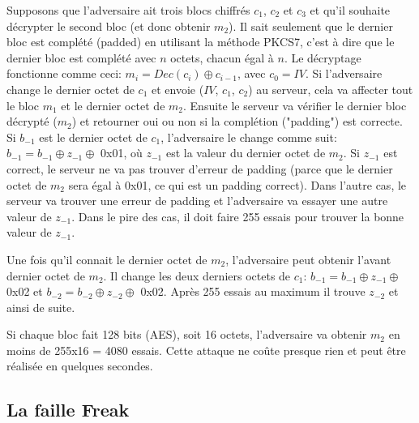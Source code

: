 Supposons que l'adversaire ait trois blocs chiffrés $c_1$, $c_2$ et $c_3$ et qu'il souhaite décrypter le second bloc (et donc obtenir $m_2$). Il sait seulement que le dernier bloc est complété (padded) en utilisant la méthode PKCS7, c'est à dire que le dernier bloc est complété avec $n$ octets, chacun égal à $n$.
Le décryptage fonctionne comme ceci: $m_i = Dec(c_i) \oplus c_{i-1}$, avec $c_0 = IV$. Si l'adversaire change le dernier octet de $c_1$ et envoie ($IV$, $c_1$, $c_2$) au serveur, cela va affecter tout le bloc $m_1$ et le dernier octet de $m_2$. Ensuite le serveur va vérifier le dernier bloc décrypté ($m_2$) et retourner oui ou non si la complétion ("padding") est correcte.
Si $b_{-1}$ est le dernier octet de $c_1$, l'adversaire le change comme suit: $b_{-1} = b_{-1} \oplus z_{-1} \oplus$ 0x01, où $z_{-1}$ est la valeur du dernier octet de $m_2$. Si $z_{-1}$ est correct, le serveur ne va pas trouver d'erreur de padding (parce que le dernier octet de $m_2$ sera égal à 0x01, ce qui est un padding correct). Dans l'autre cas, le serveur va trouver une erreur de padding et l'adversaire va essayer une autre valeur de $z_{-1}$. Dans le pire des cas, il doit faire 255 essais pour trouver la bonne valeur de $z_{-1}$.

Une fois qu'il connait le dernier octet de $m_2$, l'adversaire peut obtenir l'avant dernier octet de $m_2$. Il change les deux derniers octets de $c_1$: $b_{-1} = b_{-1} \oplus z_{-1} \oplus$ 0x02 et $b_{-2} = b_{-2} \oplus z_{-2} \oplus$ 0x02. Après 255 essais au maximum il trouve $z_{-2}$ et ainsi de suite. 

Si chaque bloc fait 128 bits (AES), soit 16 octets, l'adversaire va obtenir $m_2$ en moins de 255x16 = 4080 essais. Cette attaque ne co\^ute presque rien et peut \^etre réalisée en quelques secondes.



\subsection{La faille Freak}


